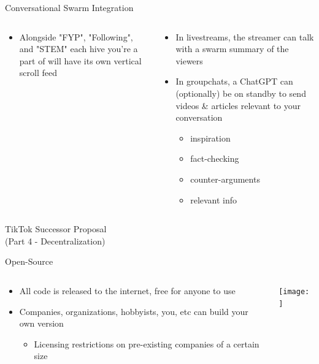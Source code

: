 \documentclass[aspectratio=169]{beamer}
\begin{document}
\begin{frame}{Conversational Swarm Integration}
\begin{columns}[T]
    \begin{column}[T]{0.5\textwidth}
        \begin{itemize}
            \item Alongside "FYP", "Following", and "STEM" each hive you're a part of will have its own vertical scroll feed
        \end{itemize}
    \end{column}
    \begin{column}{0.5\textwidth}
        \begin{itemize}
            \item In livestreams, the streamer can talk with a swarm summary of the viewers
            \item In groupchats, a ChatGPT can (optionally) be on standby to send videos \& articles relevant to your conversation
            \begin{itemize}
                \item inspiration
                \item fact-checking
                \item counter-arguments
                \item relevant info
            \end{itemize}
        \end{itemize}
    \end{column}
\end{columns}
\end{frame}

\begin{frame}
    \centering
    \Huge TikTok Successor Proposal \\
    \Huge (Part 4 - Decentralization)
\end{frame}

\begin{frame}{Open-Source}
\begin{columns}[T]
    \begin{column}[T]{0.5\textwidth}
        \begin{itemize}
            \item All code is released to the internet, free for anyone to use
            \item Companies, organizations, hobbyists, you, etc can build your own version
            \begin{itemize}
                \item Licensing restrictions on pre-existing companies of a certain size
            \end{itemize}
        \end{itemize}
    \end{column}
    \begin{column}{0.5\textwidth}
        \texttt{[image: ]}
    \end{column}
\end{columns}
\end{frame}
\end{document}
